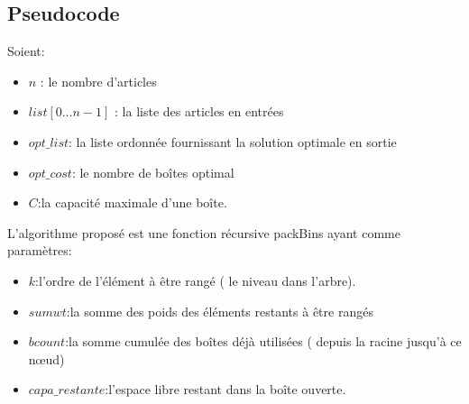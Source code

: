 \documentclass[12pt]{article}
\begin{document}
\subsection{Pseudocode}
Soient:
\begin{itemize}
    \item $n$ : le nombre d’articles 
    \item $list[0… n-1]$ : la liste des articles en entrées 
    \item $opt\_list$: la liste ordonnée fournissant la solution optimale en sortie 
    \item $opt\_cost$: le nombre de boîtes optimal
    \item $C$:la capacité maximale d’une boîte. 
\end{itemize}

L’algorithme proposé est une fonction récursive packBins ayant comme paramètres:
\begin{itemize}
    \item $k$:l’ordre de l’élément à être rangé ( le niveau dans l’arbre).
    \item $sumwt$:la somme des poids des éléments restants à être rangés
    \item $bcount$:la somme cumulée des boîtes déjà utilisées ( depuis la racine jusqu’à ce nœud)
    \item $capa\_restante$:l’espace libre restant dans la boîte ouverte.
     
\end{itemize}
\end{document}
